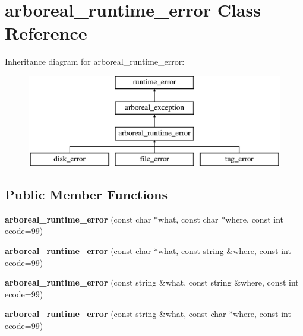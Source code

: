 \hypertarget{classarboreal__runtime__error}{}\section{arboreal\+\_\+runtime\+\_\+error Class Reference}
\label{classarboreal__runtime__error}
Inheritance diagram for arboreal\+\_\+runtime\+\_\+error\+:\begin{figure}[H]
\begin{center}
\leavevmode
\includegraphics[height=4.000000cm]{d9/dd8/classarboreal__runtime__error}
\end{center}
\end{figure}
\subsection*{Public Member Functions}
\begin{DoxyCompactItemize}
\item 
\mbox{\label{classarboreal__runtime__error_aa6970966b569a105ead4fc6a5648cb5e}} 
{\bfseries arboreal\+\_\+runtime\+\_\+error} (const char $\ast$what, const char $\ast$where, const int ecode=99)
\item 
\mbox{\label{classarboreal__runtime__error_af20cdd8f990b40293bbbf11f3fe1005b}} 
{\bfseries arboreal\+\_\+runtime\+\_\+error} (const char $\ast$what, const string \&where, const int ecode=99)
\item 
\mbox{\label{classarboreal__runtime__error_a3797d6f9ba8c5590539b280042d023a5}} 
{\bfseries arboreal\+\_\+runtime\+\_\+error} (const string \&what, const string \&where, const int ecode=99)
\item 
\mbox{\label{classarboreal__runtime__error_a897b94adcbe8bdbcd8c7299d95c4e020}} 
{\bfseries arboreal\+\_\+runtime\+\_\+error} (const string \&what, const char $\ast$where, const int ecode=99)
\end{DoxyCompactItemize}
